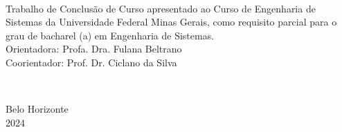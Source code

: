 
\newpage
\thispagestyle{empty}
\begin{center}
    \theauthor\\
    \vspace{5cm}
    \textbf{\MakeUppercase\thetitle} %
\end{center}
\vspace{5cm}
\hfill
\begin{minipage}{8cm}
    Trabalho de Conclusão de Curso apresentado ao Curso de Engenharia de Sistemas da Universidade Federal Minas Gerais, como requisito parcial para o grau de bacharel (a) em Engenharia de Sistemas.\\[3mm]
    Orientadora: Profa. Dra. Fulana Beltrano \\[3mm] %
    Coorientador: Prof. Dr. Ciclano da Silva %
\end{minipage}\\
\begin{center}
    \vspace*{\fill}
    Belo Horizonte\\2024
\end{center}